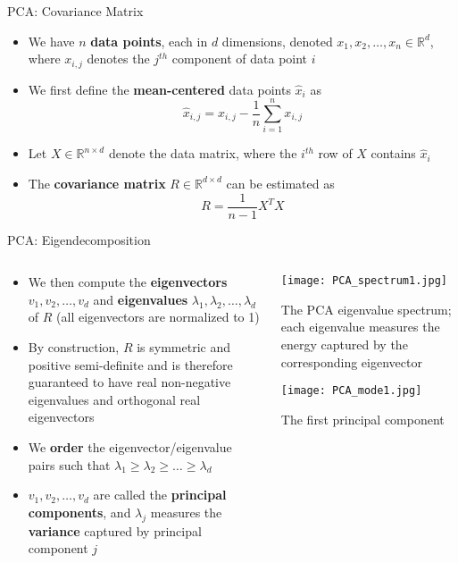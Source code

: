 \documentclass{beamer}
\begin{document}
\begin{frame}{PCA: Covariance Matrix}
  \begin{itemize}
  \item We have $n$ {\bf data points}, each in $d$ dimensions, denoted $x_1, x_2, \dots, x_n \in \mathbb{R}^d$, where $x_{i,j}$ denotes the $j^{th}$ component of data point $i$
  \item We first define the {\bf mean-centered} data points $\hat{x}_i$ as $$\hat{x}_{i,j} = x_{i,j} - \frac{1}{n} \sum_{i=1}^{n} x_{i,j}$$
  \item Let $X \in \mathbb{R}^{n \times d}$ denote the data matrix, where the $i^{th}$ row of $X$ contains $\hat{x}_i$
  \item The {\bf covariance matrix} $R \in \mathbb{R}^{d \times d}$ can be estimated as $$R = \frac{1}{n-1} X^T X$$
  \end{itemize}
\end{frame}

\begin{frame}{PCA: Eigendecomposition}
\begin{columns}
\begin{column}{0.7\textwidth}
  \begin{itemize}
    \item We then compute the {\bf eigenvectors} $v_1, v_2, \dots, v_d$ and {\bf eigenvalues} $\lambda_1, \lambda_2, \dots, \lambda_d$ of $R$ (all eigenvectors are normalized to 1)
    \item By construction, $R$ is symmetric and positive semi-definite and is therefore guaranteed to have real non-negative eigenvalues and orthogonal real eigenvectors
    \item We {\bf order} the eigenvector/eigenvalue pairs such that $\lambda_1 \ge \lambda_2 \ge \dots \ge \lambda_d$
    \item $v_1, v_2, \dots, v_d$ are called the {\bf principal components}, and $\lambda_j$ measures the {\bf variance} captured by principal component $j$
  \end{itemize}
  \end{column}

  \begin{column}{0.3\textwidth}
        \texttt{[image: PCA\_spectrum1.jpg]}\\
        {\tiny The PCA eigenvalue spectrum; each eigenvalue measures the energy captured by the corresponding eigenvector \par}

        \vspace{0.3 in}

        \texttt{[image: PCA\_mode1.jpg]}\\
        {\tiny The first principal component \par}

  \end{column}
  \end{columns}
\end{frame}
\end{document}
